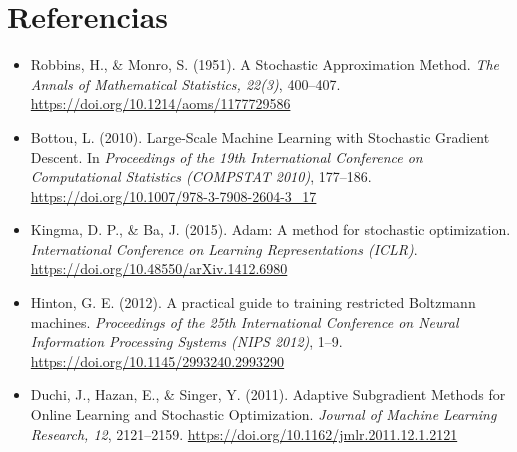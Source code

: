\documentclass[12pt]{article}
\begin{document}
	\section*{Referencias}
	
	\begin{itemize}
		\item Robbins, H., \& Monro, S. (1951). A Stochastic Approximation Method. \textit{The Annals of Mathematical Statistics, 22(3)}, 400–407. \url{https://doi.org/10.1214/aoms/1177729586}
		\item Bottou, L. (2010). Large-Scale Machine Learning with Stochastic Gradient Descent. In \textit{Proceedings of the 19th International Conference on Computational Statistics (COMPSTAT 2010)}, 177–186. \url{https://doi.org/10.1007/978-3-7908-2604-3_17}
		 \item Kingma, D. P., \& Ba, J. (2015). Adam: A method for stochastic optimization. \textit{International Conference on Learning Representations (ICLR)}. \url{https://doi.org/10.48550/arXiv.1412.6980}
		\item Hinton, G. E. (2012). A practical guide to training restricted Boltzmann machines. \textit{Proceedings of the 25th International Conference on Neural Information Processing Systems (NIPS 2012)}, 1–9. \url{https://doi.org/10.1145/2993240.2993290}
		\item Duchi, J., Hazan, E., \& Singer, Y. (2011). Adaptive Subgradient Methods for Online Learning and Stochastic Optimization. \textit{Journal of Machine Learning Research, 12}, 2121–2159. \url{https://doi.org/10.1162/jmlr.2011.12.1.2121}
	
	\end{itemize}
	
\end{document}
